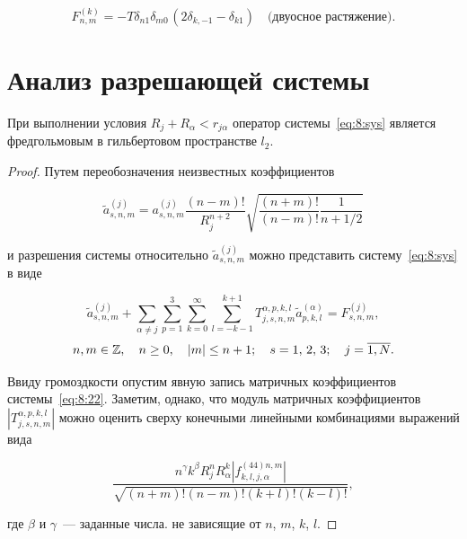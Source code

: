 \begin{equation}
F_{n,m}^{(k)} =  - T{\delta _{n1}}{\delta _{m0\,}}(2{\delta _{k, - 1}} - {\delta _{k1}})\quad\text{(двуосное растяжение)}.
\label{eq:8:20}
\end{equation}

\section{Анализ разрешающей системы}

\begin{theorem}
При выполнении условия $R_j+R_\alpha<r_{j\alpha}$ оператор системы~\eqref{eq:8:sys} является фредгольмовым в гильбертовом пространстве $l_2$.
\end{theorem}

\begin{proof}
Путем переобозначения неизвестных коэффициентов

\begin{equation}
\tilde a_{s,n,m}^{(j)} = a_{s,n,m}^{(j)}\frac{{(n - m)!}}{{R_j^{n + 2}}}\sqrt {\frac{{(n + m)!}}{{(n - m)!}}\frac{1}{{n + 1/2}}}
\end{equation}

\noindent и разрешения системы относительно $\tilde a_{s,n,m}^{(j)}$ можно представить систему~\eqref{eq:8:sys} в виде

\begin{equation}
\tilde a_{s,n,m}^{(j)} + \sum\limits_{\alpha\neq j}\sum\limits_{p = 1}^3 {\sum\limits_{k = 0}^\infty  {\sum\limits_{l=-k-1}^{k+1}{T_{j,s,n,m}^{\alpha,p,k,l}}}}\tilde a_{p,k,l}^{(\alpha)} = F_{s,n,m}^{(j)},
\label{eq:8:22}
\end{equation}
$$
n,m \in\mathbb{Z} ,\quad n \ge 0,\quad |m| \le n + 1;\quad s = 1,{\mkern 1mu} {\kern 1pt} 2,{\mkern 1mu} {\kern 1pt} 3;\quad j = \overline {1,N}.
$$

Ввиду громоздкости опустим явную запись матричных коэффициентов системы~\eqref{eq:8:22}. Заметим, однако, что модуль матричных коэффициентов $\left|T_{j,s,n,m}^{\alpha,p,k,l}\right|$ можно оценить сверху конечными линейными комбинациями выражений вида

\begin{equation}
\frac{{{n^\gamma }{k^\beta }R_j^nR_\alpha^k\left| {f_{k,l,j,\alpha}^{(44)n,m}} \right|}}{{\sqrt {(n + m)!(n - m)!(k + l)!(k - l)!} }},
\end{equation}

\noindent где $\beta$ и $\gamma$~--- заданные числа. не зависящие от $n$, $m$, $k$, $l$.


\end{proof}
